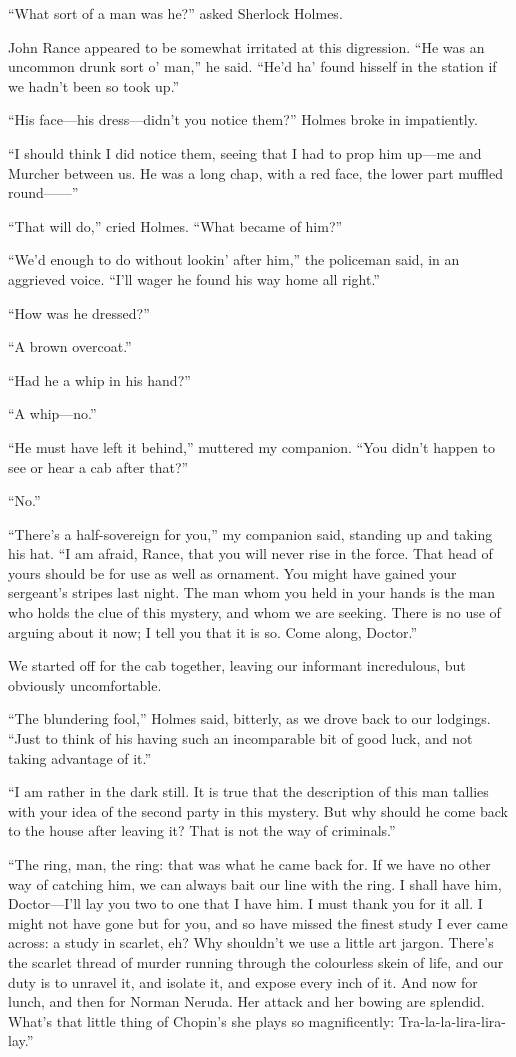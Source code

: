 \documentclass[12pt]{book}
\begin{document}
“What sort of a man was he?” asked Sherlock Holmes. 

John Rance appeared to be somewhat irritated at this digression. “He was an uncommon drunk sort o’ man,” he said. “He’d ha’ found hisself in the station if we hadn’t been so took up.” 

“His face—his dress—didn’t you notice them?” Holmes broke in impatiently. 

“I should think I did notice them, seeing that I had to prop him up—me and Murcher between us. He was a long chap, with a red face, the lower part muffled round——” 

“That will do,” cried Holmes. “What became of him?” 

“We’d enough to do without lookin’ after him,” the policeman said, in an aggrieved voice. “I’ll wager he found his way home all right.” 

“How was he dressed?” 

“A brown overcoat.” 

“Had he a whip in his hand?” 

“A whip—no.” 

“He must have left it behind,” muttered my companion. “You didn’t happen to see or hear a cab after that?” 

“No.” 

“There’s a half-sovereign for you,” my companion said, standing up and taking his hat. “I am afraid, Rance, that you will never rise in the force. That head of yours should be for use as well as ornament. You might have gained your sergeant’s stripes last night. The man whom you held in your hands is the man who holds the clue of this mystery, and whom we are seeking. There is no use of arguing about it now; I tell you that it is so. Come along, Doctor.” 

We started off for the cab together, leaving our informant incredulous, but obviously uncomfortable. 

“The blundering fool,” Holmes said, bitterly, as we drove back to our lodgings. “Just to think of his having such an incomparable bit of good luck, and not taking advantage of it.” 

“I am rather in the dark still. It is true that the description of this man tallies with your idea of the second party in this mystery. But why should he come back to the house after leaving it? That is not the way of criminals.” 

“The ring, man, the ring: that was what he came back for. If we have no other way of catching him, we can always bait our line with the ring. I shall have him, Doctor—I’ll lay you two to one that I have him. I must thank you for it all. I might not have gone but for you, and so have missed the finest study I ever came across: a study in scarlet, eh? Why shouldn’t we use a little art jargon. There’s the scarlet thread of murder running through the colourless skein of life, and our duty is to unravel it, and isolate it, and expose every inch of it. And now for lunch, and then for Norman Neruda. Her attack and her bowing are splendid. What’s that little thing of Chopin’s she plays so magnificently: Tra-la-la-lira-lira-lay.” 
\end{document}
